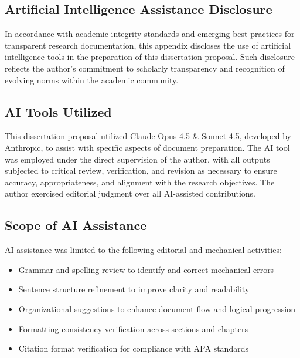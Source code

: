 \begin{appendices}


\chapter{Artificial Intelligence Assistance Disclosure}

In accordance with academic integrity standards and emerging best practices for transparent research documentation, this appendix discloses the use of artificial intelligence tools in the preparation of this dissertation proposal. Such disclosure reflects the author's commitment to scholarly transparency and recognition of evolving norms within the academic community.

\section{AI Tools Utilized}

This dissertation proposal utilized Claude Opus 4.5 \& Sonnet 4.5, developed by Anthropic, to assist with specific aspects of document preparation. The AI tool was employed under the direct supervision of the author, with all outputs subjected to critical review, verification, and revision as necessary to ensure accuracy, appropriateness, and alignment with the research objectives. The author exercised editorial judgment over all AI-assisted contributions.

\section{Scope of AI Assistance}

AI assistance was limited to the following editorial and mechanical activities:

\begin{itemize}
    \item Grammar and spelling review to identify and correct mechanical errors
    \item Sentence structure refinement to improve clarity and readability
    \item Organizational suggestions to enhance document flow and logical progression
    \item Formatting consistency verification across sections and chapters
    \item Citation format verification for compliance with APA standards
\end{itemize}


\end{appendices}
